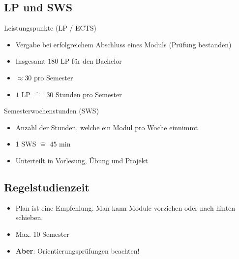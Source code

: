 \documentclass[
	aspectratio=169, 
	10pt 
]{beamer}
\begin{document}
\subsection{LP und SWS}
\begin{frame}{\insertsubsection}
    \begin{fancycolumns}[T]

        \begin{definition}{Leistungspunkte (LP / ECTS)\footnotemark[1]}
            \begin{itemize}
                \item Vergabe bei erfolgreichem Abschluss eines Moduls (Prüfung bestanden)
                \item Insgesamt $180$ LP für den Bachelor
                \item $\approx 30$ pro Semester
                \item $1 \text{ LP } \hat{=} \text{ } 30$ Stunden pro Semester
            \end{itemize}
        \end{definition}

        \nextcolumn
        
        \begin{definition}{Semesterwochenstunden (SWS)\footnotemark[2]}
            \begin{itemize}
                \item Anzahl der Stunden, welche ein Modul pro Woche einnimmt
                \item 1 SWS $\hat{=}$ $45$ min
                \item Unterteilt in Vorlesung, Übung und Projekt
            \end{itemize}
        \end{definition}
    \end{fancycolumns}

\end{frame}


\subsection{Regelstudienzeit}
\begin{frame}{\insertsubsection}
    \begin{itemize}
        \item Plan ist eine Empfehlung. Man kann Module vorziehen oder nach hinten schieben.
        \item Max. 10 Semester
        \item \large\textbf{Aber}: Orientierungsprüfungen beachten! 
    \end{itemize}
\end{frame}
    
\end{document}
